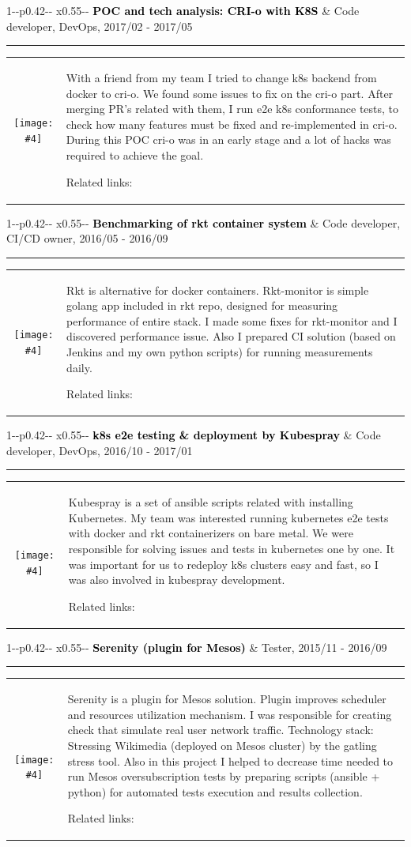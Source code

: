 \documentclass[11pt,A4]{article}
\newcommand{\mpwidth}{\linewidth-\fboxsep-\fboxsep}
\newcommand{\portfolioitem}[8]
{
\medskip
\vspace{1pt}
	\begin{tabular*}{1\mpwidth}{p{0.42\mpwidth}  x{0.55\mpwidth}}
 	\textcolor{black}{\textbf{#2}} & \textcolor{complcol}{#3}, \textcolor{bgcol}{#1}

	\end{tabular*}
\vspace{-12pt}
\textcolor{softcol}{\hrule}
\vspace{5pt}
  \begin{tabular}{ c m{13cm} }
    \begin{minipage}{.3\textwidth}
         \textcolor{white}{#8}\texttt{[image: \#4]}
    \end{minipage}
    & #6

Related links: #7 \\
  \end{tabular}
}
\newcommand{\portfoliohref}[2]{
\href[pdfnewwindow=true]{#1}{\color{complcol}{#2}}
}
\begin{document}
\newpage

\portfolioitem{2017/02 - 2017/05}{POC and tech analysis: CRI-o with K8S}{Code developer, DevOps}{img/crio-logo.png}{1}
{With a friend from my team I tried to change k8s backend from docker to cri-o. We found some issues to fix on the cri-o part. After merging PR’s related with them, I run e2e k8s conformance tests, to check how many features must be fixed and re-implemented in cri-o. During this POC cri-o was in an early stage and a lot of hacks was required to achieve the goal.}
{\portfoliohref{https://github.com/cri-o/cri-o/pull/342}{Example of contribution} | \portfoliohref{https://github.com/cri-o/cri-o/pull/353}{Result of the POC}}{}

\portfolioitem{2016/05 - 2016/09}{Benchmarking of rkt container system}{Code developer, CI/CD owner}{img/rkt.png}{0.9}
{Rkt is alternative for docker containers. Rkt-monitor is simple golang app included in rkt repo, designed for measuring performance of entire stack. I made some fixes for rkt-monitor and I discovered performance issue. Also I prepared CI solution (based on Jenkins and my own python scripts) for  running measurements daily.}
{\portfoliohref{https://github.com/rkt/rkt/pull/3093/files}{Example of contribution} | \portfoliohref{https://github.com/rkt/rkt/issues/3019}{Discovered issue}}{}

\portfolioitem{2016/10 - 2017/01}{k8s e2e testing \& deployment by Kubespray}{Code developer, DevOps}{img/k8s.png}{0.8}
{Kubespray is a set of ansible scripts related with installing Kubernetes. My team was interested running kubernetes e2e tests with docker and rkt containerizers on bare metal. We were responsible for solving issues and tests in kubernetes one by one. It was important for us to redeploy k8s clusters easy and fast, so I was also involved in kubespray development.}
{\portfoliohref{https://github.com/kubernetes-sigs/kubespray/pull/852}{PR to Kubespray} | \portfoliohref{https://github.com/kubernetes-sigs/kubespray/issues/610}{Issue submitted to Kubespray} | \portfoliohref{https://github.com/kubernetes/kubernetes/pull/35302}{k8s e2e test fix}}{-----}

\portfolioitem{2015/11 - 2016/09}{Serenity (plugin for Mesos)}{Tester}{img/mesos.png}{0.8}
{Serenity is a plugin for Mesos solution. Plugin improves scheduler and resources utilization mechanism. I was responsible for creating check that simulate real user network traffic. Technology stack: Stressing Wikimedia (deployed on Mesos cluster) by the gatling stress tool. Also in this project I helped to decrease time needed to run Mesos oversubscription tests by preparing scripts (ansible + python) for automated tests execution and results collection.}
{\portfoliohref{https://github.com/mesosphere/serenity}{Serenity on github}}{------}
\end{document}
